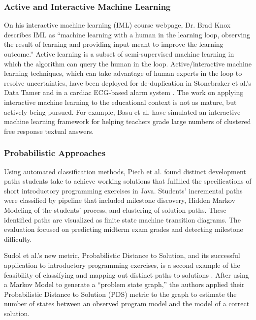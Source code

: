 \documentclass[12pt]{article}
\begin{document}
\subsubsection{Active and Interactive Machine Learning}

On his interactive machine learning (IML) course webpage, Dr. Brad Knox describes IML as ``machine learning with a human in the learning loop, observing the result of learning and providing input meant to improve the learning outcome.'' Active learning is a subset of semi-supervised machine learning in which the algorithm can query the human in the loop. Active/interactive machine learning techniques, which can take advantage of human experts in the loop to resolve uncertainties, have been deployed for de-duplication in Stonebraker et al.'s Data Tamer \cite{stonebraker2013data} and in a cardiac ECG-based alarm system \cite{JWiensNIPS}. The work on applying interactive machine learning to the educational context is not as mature, but actively being pursued. For example, Basu et al. \cite{basupowergrading} have simulated an interactive machine learning framework for helping teachers grade large numbers of clustered free response textual answers.


\subsubsection{Probabilistic Approaches}

Using automated classification methods, Piech et al. \cite{Piech} found distinct development paths students take to achieve working solutions that fulfilled the specifications of short introductory programming exercises in Java. Students' incremental paths were classified by pipeline that included milestone discovery, Hidden Markov Modeling of the students' process, and clustering of solution paths. These identified paths are visualized as finite state machine transition diagrams. The evaluation focused on predicting midterm exam grades and detecting milestone difficulty. 

Sudol et al.'s new metric, Probabilistic Distance to Solution, and its successful application to introductory programming exercises, is a second example of the feasibility of classifying and mapping out distinct paths to solutions \cite{sudol12}. After using a Markov Model to generate a ``problem state graph,'' the authors applied their Probabilistic Distance to Solution (PDS) metric to the graph to estimate the number of states between an observed program model and the model of a correct solution.
\end{document}
